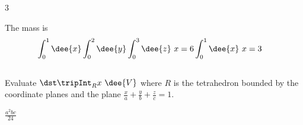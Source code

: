 \begin{answer}
$3$
\end{answer}

\begin{solution}
The mass is
\begin{align*}
\int_0^1\dee{x} \int_0^2\dee{y}\int_0^3\dee{z}\ x
&= 6\int_0^1 \dee{x}\ x =3
\end{align*}
\end{solution}


\subsection*{\Procedural}

\begin{question}
Evaluate $\dst\tripInt_R x\ \dee{V}$ where $R$ is the tetrahedron bounded
by the coordinate planes and the plane 
$\frac{x}{a}+\frac{y}{b}+\frac{z}{c}=1$.
\end{question}

%

\begin{answer}
$\frac{a^2bc}{24}$
\end{answer}

